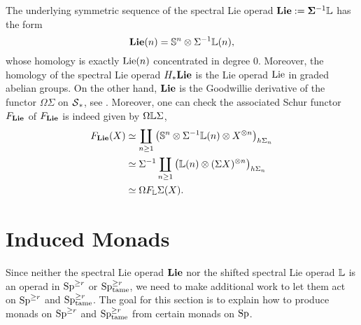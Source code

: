 \begin{remark}
\label{Remark on shifted Lie operads}
The underlying symmetric sequence of the spectral Lie operad $\mathbf{Lie}:= \mathbf{\Sigma}^{-1}{\mathbb{L}}$
	has the form 	
	$$
	\mathbf{Lie}(n)= {\mathbb{S}}^{n} \otimes \Sigma^{-1} {\mathbb{L}}(n),
	$$
	whose homology is exactly $\operatorname{Lie}(n)$ concentrated in degree $0$.
	Moreover, the homology of the spectral Lie operad $H_{*}\mathbf{Lie}$ is the Lie operad $\operatorname{Lie}$ in graded abelian groups.
	On the other hand, $\mathbf{Lie}$ is the Goodwillie derivative of the functor $\Omega\Sigma$ on $\operatorname{\mathcal{S}}_*$, see \cite[Section 8]{GoodwillieIII}.
	Moreover, one can check the associated Schur functor $F_{\mathbf{Lie}}$ of $F_{\mathbf{Lie}}$ is indeed given by $\Omega{\mathbb{L}} \Sigma$,
	\begin{align*}
		F_{\mathbf{Lie}}(X) &\simeq \coprod_{n\geq 1}
		\big(
		{\mathbb{S}}^{n} \otimes \Sigma^{-1}{\mathbb{L}}(n) 
		\otimes X^{\otimes n}
		\big)_{h\Sigma_n}\\
		& \simeq 
		\Sigma^{-1}
		\coprod_{n\geq 1}
		\big(
		{\mathbb{L}}(n) 
		\otimes (\Sigma X)^{\otimes n}
		\big)_{h\Sigma_n}\\
		& \simeq 
		\Omega F_{{\mathbb{L}}}\Sigma(X).
	\end{align*}	
\end{remark}


\section{Induced Monads}
\label{Section: Induced Monads}
Since neither the spectral Lie operad $\mathbf{Lie}$ nor the shifted spectral Lie operad ${\mathbb{L}}$ is an operad in $\operatorname{Sp}^{\geq r}$ or $\operatorname{Sp}^{\geq r}_{\operatorname{\operatorname{tame}}}$, we need to make additional work to let them act on $\operatorname{Sp}^{\geq r}$ and $\operatorname{Sp}^{\geq r}_{\operatorname{\operatorname{tame}}}$.
The goal for this section is to explain how to produce monads on $\operatorname{Sp}^{\geq r}$ and $\operatorname{Sp}^{\geq r}_{\operatorname{\operatorname{tame}}}$ from certain monads on $\operatorname{Sp}$.

